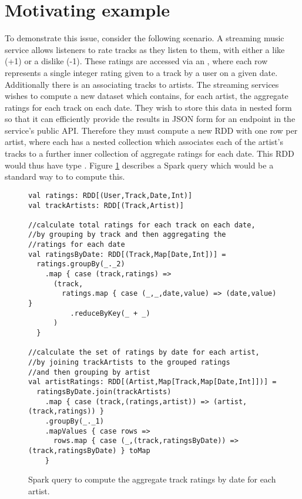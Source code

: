 \section{Motivating example} { \label{motivatingexample}

To demonstrate this issue, consider the following scenario. A streaming music service allows listeners to rate tracks as they listen to them, with either a like (+1) or a dislike (-1). These ratings are accessed via an , where each row represents a single integer rating given to a track by a user on a given date. Additionally there is an  associating tracks to artists. The streaming services wishes to compute a new dataset which contains, for each artist, the aggregate ratings for each track on each date. They wish to store this data in nested form so that it can efficiently provide the results in JSON form for an endpoint in the service's public API. Therefore they must compute a new RDD with one row per artist, where each has a nested collection which associates each of the artist's tracks to a further inner collection of aggregate ratings for each date. This RDD would thus have type . Figure \ref{exsparkquery} describes a Spark query which would be a standard way to to compute this.

\begin{figure}
\begin{lstlisting}
val ratings: RDD[(User,Track,Date,Int)]
val trackArtists: RDD[(Track,Artist)]

//calculate total ratings for each track on each date,
//by grouping by track and then aggregating the
//ratings for each date
val ratingsByDate: RDD[(Track,Map[Date,Int])] =
  ratings.groupBy(_._2)
    .map { case (track,ratings) =>
      (track,
        ratings.map { case (_,_,date,value) => (date,value) }
          .reduceByKey(_ + _)
      )
  }

//calculate the set of ratings by date for each artist,
//by joining trackArtists to the grouped ratings
//and then grouping by artist
val artistRatings: RDD[(Artist,Map[Track,Map[Date,Int]])] =
  ratingsByDate.join(trackArtists)
    .map { case (track,(ratings,artist)) => (artist,(track,ratings)) }
    .groupBy(_._1)
    .mapValues { case rows =>
      rows.map { case (_,(track,ratingsByDate)) => (track,ratingsByDate) } toMap
    }
\end{lstlisting}
\caption{Spark query to compute the aggregate track ratings by date for each artist.}
\label{exsparkquery}
\end{figure}

}

